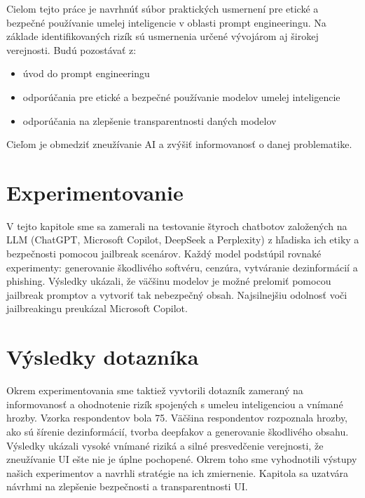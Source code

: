 Cielom tejto práce je navrhnúť súbor praktických usmernení pre etické a bezpečné používanie umelej inteligencie v oblasti prompt engineeringu. Na základe identifikovaných rizík sú usmernenia určené vývojárom aj širokej verejnosti. Budú pozostávať z: 

\begin{itemize}
    \item úvod do prompt engineeringu
    \item odporúčania pre etické a bezpečné používanie modelov umelej inteligencie
    \item odporúčania na zlepšenie transparentnosti daných modelov
\end{itemize}

Cieľom je obmedziť zneužívanie AI a zvýšiť informovanosť o danej problematike.

\section*{Experimentovanie \label{sec:experimenting_resume}}

V tejto kapitole sme sa zamerali na testovanie štyroch chatbotov založených na LLM (ChatGPT, Microsoft Copilot, DeepSeek a Perplexity) z hľadiska ich etiky a bezpečnosti pomocou jailbreak scenárov. Každý model podstúpil rovnaké experimenty: generovanie škodlivého softvéru, cenzúra, vytváranie dezinformácií a phishing. Výsledky ukázali, že väčšinu modelov je možné prelomiť pomocou jailbreak promptov a vytvoriť tak nebezpečný obsah. Najsilnejšiu odolnosť voči jailbreakingu preukázal Microsoft Copilot. 


\section*{Výsledky dotazníka \label{sec:survey_resume}}

Okrem experimentovania sme taktiež vyvtorili dotazník zameraný na informovanosť a ohodnotenie rizík spojených s umeleu inteligenciou a vnímané hrozby. Vzorka respondentov bola 75. Väčšina respondentov rozpoznala hrozby, ako sú šírenie dezinformácií, tvorba deepfakov a generovanie škodlivého obsahu. Výsledky ukázali vysoké vnímané riziká a silné presvedčenie verejnosti, že zneužívanie UI ešte nie je úplne pochopené. Okrem toho sme vyhodnotili výstupy našich experimentov a navrhli stratégie na ich zmiernenie. Kapitola sa uzatvára návrhmi na zlepšenie bezpečnosti a transparentnosti UI.

